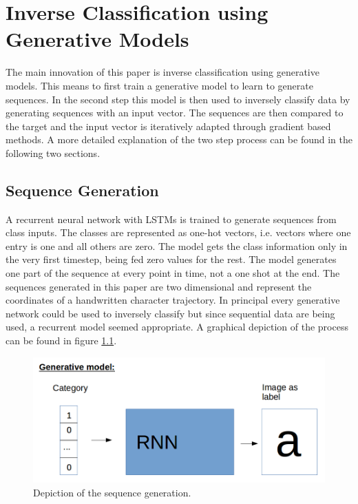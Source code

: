 \chapter{Inverse Classification using Generative Models}
\label{chap:ICGM}

The main innovation of this paper is inverse classification using generative models. This means to first train a generative model to learn to generate sequences. In the second step this model is then used to inversely classify data by generating sequences with an input vector. The sequences are then compared to the target and the input vector is iteratively adapted through gradient based methods. A more detailed explanation of the two step process can be found in the following two sections.

\section{Sequence Generation}

A recurrent neural network with LSTMs is trained to generate sequences from class inputs. The classes are represented as one-hot vectors, i.e. vectors where one entry is one and all others are zero. The model gets the class information only in the very first timestep, being fed zero values for the rest. The model generates one part of the sequence at every point in time, not a one shot at the end. The sequences generated in this paper are two dimensional and represent the coordinates of a handwritten character trajectory. In principal every generative network could be used to inversely classify but since sequential data are being used, a recurrent model seemed appropriate. A graphical depiction of the process can be found in figure \ref{fig:generative_model}.

\begin{figure}[!htb]
	\centering
	\includegraphics[width=\textwidth]{images/generative_model.png}
	\caption{Depiction of the sequence generation.}
	\label{fig:generative_model}
\end{figure}

